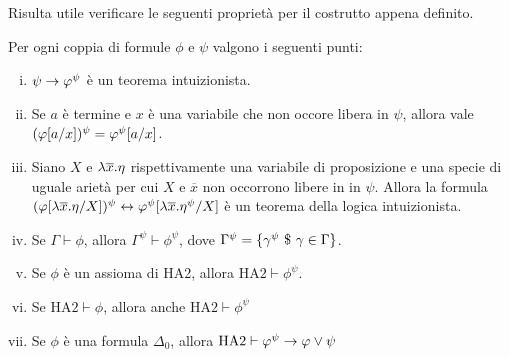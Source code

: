 \documentclass[]{marticle}
\begin{document}
Risulta utile verificare le seguenti propriet\`a per il costrutto appena
definito.
\begin{block}[Lemma]
    Per ogni coppia di formule $\phi$ e $\psi$ valgono i seguenti punti:
    \begin{enumerate}[(i)]
        \item $\psi\rightarrow \varphi^\psi$ \`e un teorema intuizionista.
        \item Se $a$ \`e termine e $x$ \`e una variabile che non occore libera
            in $\psi$, allora vale $(\varphi[a/x])^\psi = \varphi^\psi[a/x]$.
        \item Siano $X$ e $\lambda \overline{x}.\eta$ rispettivamente una variabile
            di proposizione e una specie di uguale ariet\`a per cui $X$ e
            $\overline{x}$ non occorrono libere in in $\psi$. Allora la formula
            $(\varphi[\lambda \overline{x}.\eta/X])^\psi \leftrightarrow
            \varphi^\psi[\lambda \overline{x}.\eta^\psi/X] $ \`e un teorema della
            logica intuizionista.
        \item Se $\Gamma \vdash \phi$, allora $\Gamma^\psi \vdash \phi^\psi$,
            dove $\Gamma^\psi = \{\gamma^\psi \ \$\  \gamma \in \Gamma\}$.
        \item Se $\phi$ \`e un assioma di HA2, allora $\text{HA2}\vdash
            \phi^\psi$.
        \item Se $\text{HA2}\vdash \phi$, allora anche $\text{HA2}\vdash
            \phi^\psi$
        \item Se $\phi$ \`e una formula $\Delta_0$, allora $\text{HA2} \vdash
            \varphi^\psi \rightarrow \varphi\lor \psi$
    \end{enumerate}
\end{block}
\end{document}
